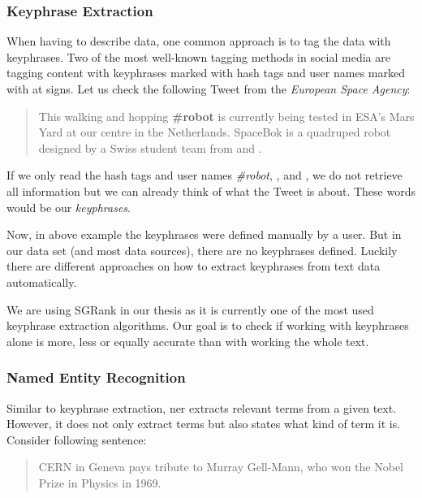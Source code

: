 \subsubsection{Keyphrase Extraction}
\label{subsubsec:3_keyphrase_extraction}

When having to describe data, one common approach is to tag the data with keyphrases.
Two of the most well-known tagging methods in social media
are tagging content with keyphrases marked with hash tags and user names marked with at signs.
Let us check the following Tweet from the \textit{European Space Agency}\cite{ESATweet}:

\begin{quote}
    This walking and hopping \textbf{\#robot} is currently being tested in ESA’s Mars Yard
    at our \textbf{} centre in the Netherlands.
    SpaceBok is a quadruped robot designed by a Swiss student team from \textbf{}
    and \textbf{}.
\end{quote}

If we only read the hash tags and user names \textit{\#robot}, \textit{},
\textit{} and \textit{},
we do not retrieve all information but we can already think of what the Tweet is about.
These words would be our \textit{keyphrases}.

Now, in above example the keyphrases were defined manually by a user.
But in our data set (and most data sources), there are no keyphrases defined.
Luckily there are different approaches on how to extract keyphrases from text data automatically.

We are using SGRank\cite{SGRank} in our thesis as it is currently one of the most used keyphrase extraction algorithms.
Our goal is to check if working with keyphrases alone is more, less or equally accurate
than with working the whole text.

\subsubsection{Named Entity Recognition}
\label{subsubsec:3_named_entity_recognition}

Similar to keyphrase extraction, \Gls{ner} extracts relevant terms from a given text.
However, it does not only extract terms but also states what kind of term it is.
Consider following sentence:

\begin{quote}
    CERN in Geneva pays tribute to Murray Gell-Mann, who won the Nobel Prize in Physics in 1969.
\end{quote}

